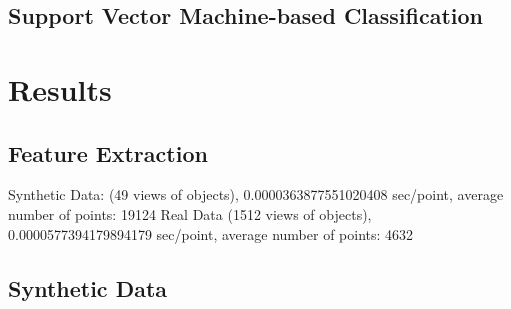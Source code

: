 \documentclass[conference]{sty/IEEEtran}
\begin{document}
\subsection{Support Vector Machine-based Classification}

\section{Results}
\label{sec:results}
\subsection{Feature Extraction}
Synthetic Data: (49 views of objects), 0.0000363877551020408 sec/point, average number of points: 19124
Real Data (1512 views of objects), 0.0000577394179894179  sec/point,  average number of points: 4632

\subsection{Synthetic Data}
\end{document}
